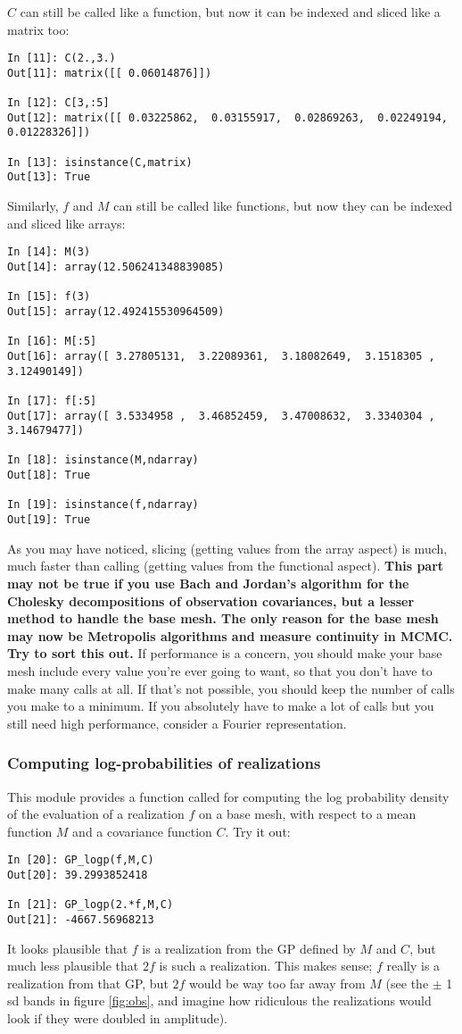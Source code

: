 \documentclass{manual}
\begin{document}
$C$ can still be called like a function, but now it can be indexed and sliced like a matrix too:
\begin{verbatim}
In [11]: C(2.,3.)
Out[11]: matrix([[ 0.06014876]])

In [12]: C[3,:5]
Out[12]: matrix([[ 0.03225862,  0.03155917,  0.02869263,  0.02249194,  0.01228326]])

In [13]: isinstance(C,matrix)
Out[13]: True
\end{verbatim}
Similarly, $f$ and $M$ can still be called like functions, but now they can be indexed and sliced like arrays:
\begin{verbatim}
In [14]: M(3)
Out[14]: array(12.506241348839085)

In [15]: f(3)
Out[15]: array(12.492415530964509)

In [16]: M[:5]
Out[16]: array([ 3.27805131,  3.22089361,  3.18082649,  3.1518305 ,  3.12490149])

In [17]: f[:5]
Out[17]: array([ 3.5334958 ,  3.46852459,  3.47008632,  3.3340304 ,  3.14679477])

In [18]: isinstance(M,ndarray)
Out[18]: True

In [19]: isinstance(f,ndarray)
Out[19]: True
\end{verbatim}

As you may have noticed, slicing (getting values from the array aspect) is much, much faster than calling (getting values from the functional aspect). \textbf{This part may not be true if you use Bach and Jordan's algorithm for the Cholesky decompositions of observation covariances, but a lesser method to handle the base mesh. The only reason for the base mesh may now be Metropolis algorithms and measure continuity in MCMC. Try to sort this out.} If performance is a concern, you should make your base mesh include every value you're ever going to want, so that you don't have to make many calls at all. If that's not possible, you should keep the number of calls you make to a minimum. If you absolutely have to make a lot of calls but you still need high performance, consider a Fourier representation.
 
\subsubsection{Computing log-probabilities of realizations}\label{subsub:logp}
This module provides a function called  for computing the log probability density of the evaluation of a realization $f$ on a base mesh, with respect to a mean function $M$ and a covariance function $C$. Try it out:
\begin{verbatim}
In [20]: GP_logp(f,M,C)
Out[20]: 39.2993852418

In [21]: GP_logp(2.*f,M,C)
Out[21]: -4667.56968213
\end{verbatim}
It looks plausible that $f$ is a realization from the GP defined by $M$ and $C$, but much less plausible that $2f$ is such a realization. This makes sense; $f$ really is a realization from that GP, but $2f$ would be way too far away from $M$ (see the $\pm$ 1 sd bands in figure \ref{fig:obs}, and imagine how ridiculous the realizations would look if they were doubled in amplitude).
\end{document}
